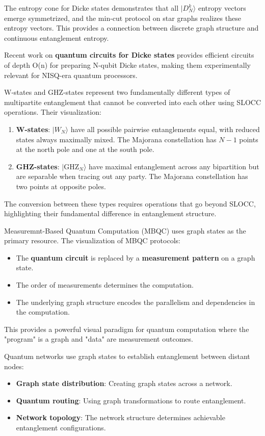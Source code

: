 \documentclass[12pt,a4paper]{article}
\begin{document}
The entropy cone for Dicke states demonstrates that all $|D_N^k\rangle$ entropy vectors emerge symmetrized, and the min-cut protocol on star graphs realizes these entropy vectors. This provides a connection between discrete graph structure and continuous entanglement entropy.

Recent work on \textbf{quantum circuits for Dicke states} provides efficient circuits of depth O(n) for preparing N-qubit Dicke states, making them experimentally relevant for NISQ-era quantum processors.

W-states and GHZ-states represent two fundamentally different types of multipartite entanglement that cannot be converted into each other using SLOCC operations. Their visualization:

\begin{enumerate}
	\item \textbf{W-states}: $|W_N\rangle$ have all possible pairwise entanglements equal, with reduced states always maximally mixed. The Majorana constellation has $N-1$ points at the north pole and one at the south pole.

	\item \textbf{GHZ-states}: $|\text{GHZ}_N\rangle$ have maximal entanglement across any bipartition but are separable when tracing out any party. The Majorana constellation has two points at opposite poles.
\end{enumerate}

The conversion between these types requires operations that go beyond SLOCC, highlighting their fundamental difference in entanglement structure.

Measuremnt-Based Quantum Computation (MBQC) uses graph states as the primary resource. The visualization of MBQC protocols:
\begin{itemize}
	\item The \textbf{quantum circuit} is replaced by a \textbf{measurement pattern} on a graph state.
	\item The order of measurements determines the computation.
	\item The underlying graph structure encodes the parallelism and dependencies in the computation.
\end{itemize}

This provides a powerful visual paradigm for quantum computation where the "program" is a graph and "data" are measurement outcomes.

Quantum networks use graph states to establish entanglement between distant nodes:
\begin{itemize}
	\item \textbf{Graph state distribution}: Creating graph states across a network.
	\item \textbf{Quantum routing}: Using graph transformations to route entanglement.
	\item \textbf{Network topology}: The network structure determines achievable entanglement configurations.
\end{itemize}
\end{document}
